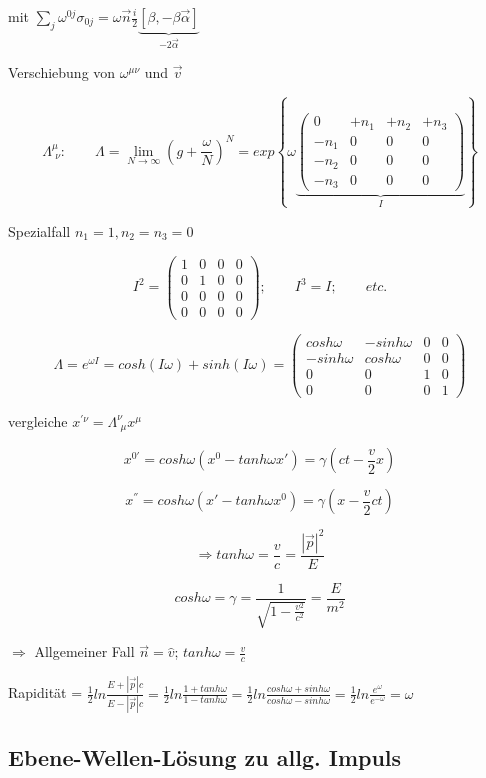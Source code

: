mit \( \sum_j\omega^{0j}\sigma_{0j} = \omega \vec n \frac{i}{2}\underbrace{[\beta,-\beta\vec\alpha]}_{-2\vec\alpha} \)

Verschiebung von \(\omega^{\mu\nu}\) und \(\vec v\)


\[\Lambda^\mu_{\,\,\nu}: \qquad \Lambda = \lim_{N \to \infty} (g+\frac{\omega}{N})^N = exp\left\{\omega\underbrace{ \begin{pmatrix} 0&+n_1&+n_2&+n_3\\  -n_1&0&0&0\\   -n_2&0&0&0\\  -n_3&0&0&0 \end{pmatrix}}_{I}  \right\}\]

Spezialfall \(n_1 = 1, n_2=n_3 = 0\)

\[I^2 = \begin{pmatrix} 1&0&0&0\\ 0&1&0&0 \\ 0&0&0&0\\ 0&0&0&0 \end{pmatrix};\qquad I^3=I;\qquad etc. \]

\[\Lambda = e^{\omega I} = cosh(I\omega) + sinh(I\omega) =  \begin{pmatrix} cosh\omega&-sinh\omega&0&0\\ -sinh\omega&cosh\omega&0&0 \\ 0&0&1&0\\ 0&0&0&1 \end{pmatrix} \]

vergleiche \(x^{'\nu} = \Lambda^\nu_{\,\,\mu}x^\mu\)


\[x^{0'} = cosh\omega(x^0-tanh\omega x') = \gamma(ct-\frac{v}{2}x)\]

\[x^{''} = cosh\omega(x'-tanh\omega x^0) = \gamma(x-\frac{v}{2}ct)\]

\[\Rightarrow tanh \omega = \frac{v}{c} = \frac{|\vec p|^2}{E}\]

\[cosh\omega =\gamma = \frac{1}{\sqrt{1-\frac{v^2}{c^2}}} = \frac{E}{m^2} \]


\(\Rightarrow \) Allgemeiner Fall \(\vec n = \hat v\); \(tanh\omega = \frac{v}{c}\)


Rapidität = \(\frac{1}{2} ln\frac{E+|\vec p|c}{E-|\vec p|c} =\frac{1}{2} ln\frac{1+tanh\omega}{1-tanh\omega} = \frac{1}{2} ln\frac{cosh\omega+sinh\omega}{cosh\omega-sinh\omega}  = \frac{1}{2}ln\frac{e^\omega}{e^{-\omega}} =\omega \)


\subsection{Ebene-Wellen-Lösung zu allg. Impuls}

